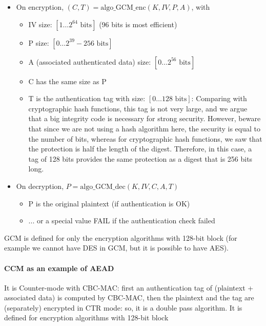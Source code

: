 \begin{itemize}
    \item On encryption, $(C, T) = \text{algo\_GCM\_enc}(K, IV, P, A)$, with
          \begin{itemize}
              \item IV size: $[1 \ldots 2^{64} \text{ bits}]$ (96 bits is most efficient)
              \item P size: $[0 \ldots 2^{39} - 256 \text{ bits}]$
              \item A (associated authenticated data) size: $[0 \ldots 2^{56} \text{ bits}]$
              \item C has the same size as P
              \item T is the authentication tag with size: $[0 \ldots 128 \text{ bits}]$: Comparing with cryptographic hash functions, this tag is not very large, and we argue that a big integrity code is necessary for strong security. However, beware that since we are not using a hash algorithm here, the security is equal to the number of bits, whereas for cryptographic hash functions, we saw that the protection is half the length of the digest. Therefore, in this case, a tag of 128 bits provides the same protection as a digest that is 256 bits long.

          \end{itemize}
    \item On decryption, $P = \text{algo\_GCM\_dec}(K, IV, C, A, T)$
          \begin{itemize}
              \item P is the original plaintext (if authentication is OK)
              \item ... or a special value FAIL if the authentication check failed
          \end{itemize}
\end{itemize}

GCM is defined for only the encryption algorithms with 128-bit block (for example we cannot have DES in
GCM, but it is possible to have AES).

\paragraph{CCM as an example of AEAD}
It is Counter-mode with CBC-MAC: first an authentication tag of (plaintext + associated data) is computed
by CBC-MAC, then the plaintext and the tag are (separately) encrypted in CTR mode: so, it is a double pass
algorithm. It is defined for encryption algorithms with 128-bit block


